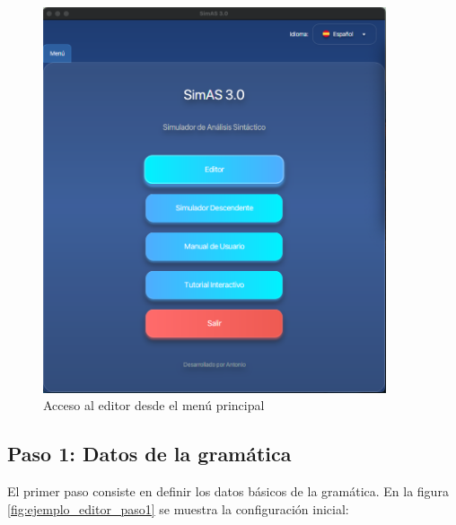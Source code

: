 \needspace{8cm}
\begin{figure}[H]
    \centering
    \includegraphics[width=0.9\textwidth]{figuras/ejemplo_practico/menu.png}
    \caption{Acceso al editor desde el menú principal}
    \label{fig:ejemplo_menu}
\end{figure}

\subsection{Paso 1: Datos de la gramática}

El primer paso consiste en definir los datos básicos de la gramática. En la figura \ref{fig:ejemplo_editor_paso1} se muestra la configuración inicial:

